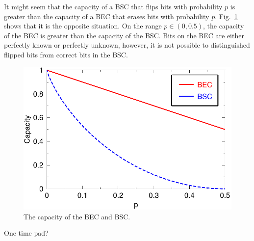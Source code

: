 
It might seem that the capacity of a {BSC} that flips bits with probability $p$ is greater than the capacity of a {BEC} that erases bits with probability $p$. Fig.~\ref{fig:becbsc} shows that it is the opposite situation. On the range $p\in\left( 0,0.5\right)$, the capacity of the {BEC} is greater than the capacity of the {BSC}. Bits on the {BEC} are either perfectly known or perfectly unknown, however, it is not possible to distinguished flipped bits from correct bits in the {BSC}.

\begin{figure}[h]
\begin{center}
\includegraphics[width=\linewidth]{figures/becbsc.pdf}
\caption{The capacity of the BEC and BSC.}
\label{fig:becbsc}
\end{center}
\end{figure}


One time pad?
